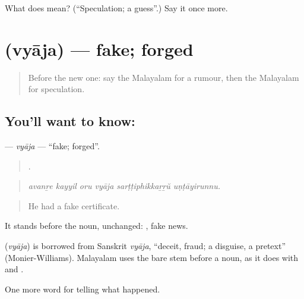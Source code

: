 \begin{tcolorbox}[breakable,colback=teal!4,colframe=teal!35!black,title={Before you move on}]
What does  mean? (\textquotedblleft{}Speculation; a guess\textquotedblright{}.) Say it once more.
\end{tcolorbox}
\section[\texorpdfstring{\ml{വ്യാജ} (vyāja)}{വ്യാജ (vyāja)}]{ (vyāja) — fake; forged}

\label{lesson:ML-C353-vyaja}



\begin{quote}
Before the new one: say the Malayalam for a rumour, then the Malayalam for speculation.
\end{quote}

\subsection*{You'll want to know: }
\textbf{} — \emph{vyāja} — \textquotedblleft{}fake; forged\textquotedblright{}.

\begin{quote}
     .
\end{quote}

\begin{quote}
\emph{avanṟe kayyil oru vyāja sarṭṭiphikkaṟṟŭ uṇṭāyirunnu.}
\end{quote}

\begin{quote}
He had a fake certificate.
\end{quote}

It stands before the noun, unchanged:  , fake news.

\begin{cousinweb}
\textbf{} (\emph{vyāja}) is borrowed from Sanskrit \emph{vyāja}, \textquotedblleft{}deceit, fraud; a disguise, a pretext\textquotedblright{} (Monier-Williams). Malayalam uses the bare stem before a noun, as it does with  and .
\end{cousinweb}

\begin{grammarlens}[title={What you've built}]
One more word for telling what happened.
\end{grammarlens}

